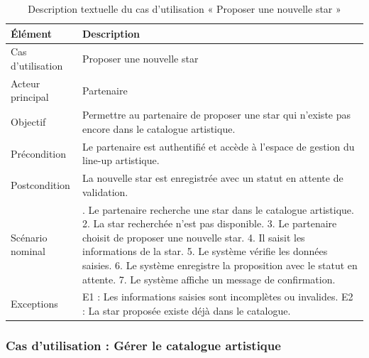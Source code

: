 \begin{table}[H]
\centering
\caption{Description textuelle du cas d’utilisation « Proposer une nouvelle star »}
\label{tableau:5-5}
\renewcommand{\arraystretch}{1.2}
\begin{tabularx}{\textwidth}{|>{\raggedright\arraybackslash}X|>{\raggedright\arraybackslash}X|}
\hline
\rowcolor[HTML]{ECF4FF}
\textbf{Élément} & \textbf{Description} \\
\hline
Cas d’utilisation & Proposer une nouvelle star \\
\hline
Acteur principal & Partenaire \\
\hline
Objectif & Permettre au partenaire de proposer une star qui n’existe pas encore dans le catalogue artistique. \\
\hline
Précondition & Le partenaire est authentifié et accède à l’espace de gestion du line-up artistique. \\
\hline
Postcondition & La nouvelle star est enregistrée avec un statut en attente de validation. \\
\hline
Scénario nominal & 1. Le partenaire recherche une star dans le catalogue artistique.\newline{} 2. La star recherchée n’est pas disponible.\newline{} 3. Le partenaire choisit de proposer une nouvelle star.\newline{} 4. Il saisit les informations de la star.\newline{} 5. Le système vérifie les données saisies.\newline{} 6. Le système enregistre la proposition avec le statut en attente.\newline{} 7. Le système affiche un message de confirmation. \\
\hline
Exceptions & E1 : Les informations saisies sont incomplètes ou invalides.\newline{} E2 : La star proposée existe déjà dans le catalogue. \\
\hline
\end{tabularx}
\end{table}


\subsubsection{Cas d’utilisation : Gérer le catalogue artistique}


